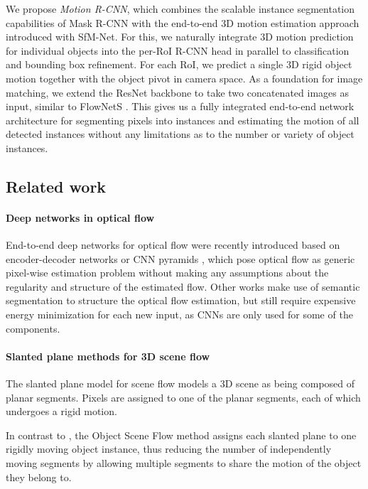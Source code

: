 We propose \emph{Motion R-CNN}, which combines the scalable instance segmentation capabilities of
Mask R-CNN with the end-to-end 3D motion estimation approach introduced with SfM-Net.
For this, we naturally integrate 3D motion prediction for individual objects into the per-RoI R-CNN head
in parallel to classification and bounding box refinement.
For each RoI, we predict a single 3D rigid object motion together with the object
pivot in camera space.
As a foundation for image matching, we extend the ResNet \cite{ResNet} backbone to take
two concatenated images as input, similar to FlowNetS \cite{FlowNet}.
This gives us a fully integrated end-to-end network architecture for segmenting pixels into instances
and estimating the motion of all detected instances without any limitations
as to the number or variety of object instances.


\subsection{Related work}

\paragraph{Deep networks in optical flow}

End-to-end deep networks for optical flow were recently introduced
based on encoder-decoder networks or CNN pyramids \cite{FlowNet, FlowNet2, SPyNet},
which pose optical flow as generic pixel-wise estimation problem without making any assumptions
about the regularity and structure of the estimated flow.
Other works \cite{FlowLayers, ESI, MRFlow} make use of semantic segmentation to structure
the optical flow estimation, but still require expensive energy minimization for each
new input, as CNNs are only used for some of the components.

\paragraph{Slanted plane methods for 3D scene flow}
The slanted plane model for scene flow \cite{PRSF, PRSM} models a 3D scene as being
composed of planar segments. Pixels are assigned to one of the planar segments,
each of which undergoes a rigid motion.

In contrast to \cite{PRSF, PRSM}, the Object Scene Flow method \cite{KITTI2015}
assigns each slanted plane to one rigidly moving object instance, thus
reducing the number of independently moving segments by allowing multiple
segments to share the motion of the object they belong to.

